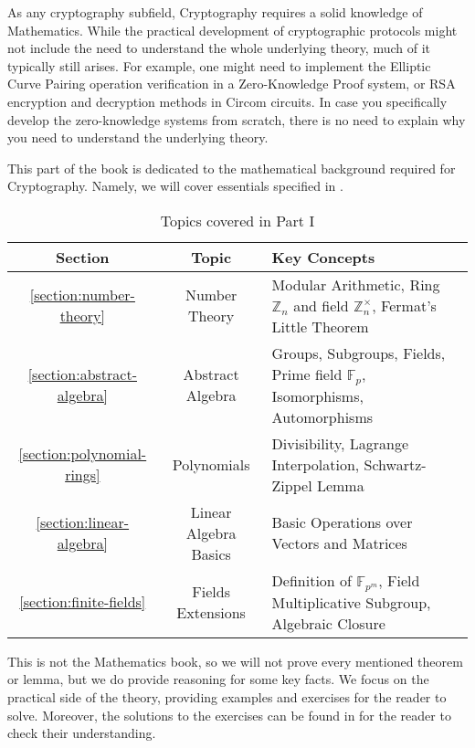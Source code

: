 \documentclass[../../lecture-notes-148x210.tex]{subfiles}
\begin{document}
As any cryptography subfield, Cryptography requires a solid knowledge of
Mathematics. While the practical development of cryptographic protocols might
not include the need to understand the whole underlying theory, much of it
typically still arises. For example, one might need to implement the Elliptic
Curve Pairing operation verification in a Zero-Knowledge Proof system, or RSA
encryption and decryption methods in Circom circuits. In case you specifically
develop the zero-knowledge systems from scratch, there is no need to explain why
you need to understand the underlying theory.

This part of the book is dedicated to the mathematical background required for
Cryptography. Namely, we will cover essentials specified in .

\begin{table}[H]
    \centering
    \begin{tabularx}{\textwidth}{|c|c|X|}
        \hline
        \rowcolor{blue!30}\textbf{Section} & \textbf{Topic} & \textbf{Key Concepts} \\
        \hline
        \rowcolor{blue!10}\ref{section:number-theory} & Number Theory & Modular
        Arithmetic, Ring $\mathbb{Z}_n$ and field $\mathbb{Z}_n^{\times}$,
        Fermat's Little Theorem \\
        \hline
        \rowcolor{blue!20}\ref{section:abstract-algebra} & Abstract Algebra &
        Groups, Subgroups, Fields, Prime field $\mathbb{F}_p$, Isomorphisms,
        Automorphisms \\
        \hline
        \rowcolor{blue!10}\ref{section:polynomial-rings} & Polynomials & Divisibility, Lagrange Interpolation, Schwartz-Zippel Lemma \\
        \hline
        \rowcolor{blue!20}\ref{section:linear-algebra} & Linear Algebra Basics & Basic Operations over Vectors and Matrices \\
        \hline
        \rowcolor{blue!10}\ref{section:finite-fields} & Fields Extensions & Definition of $\mathbb{F}_{p^m}$, Field Multiplicative Subgroup, Algebraic Closure \\
        \hline
    \end{tabularx}
    \caption{Topics covered in Part I}
    \label{tab:essentialls}
\end{table}

This is not the Mathematics book, so we will not prove every mentioned theorem
or lemma, but we do provide reasoning for some key facts. We
focus on the practical side of the theory, providing examples and exercises for
the reader to solve. Moreover, the solutions to the exercises can be found 
in  for the reader to check their understanding.
\end{document}

